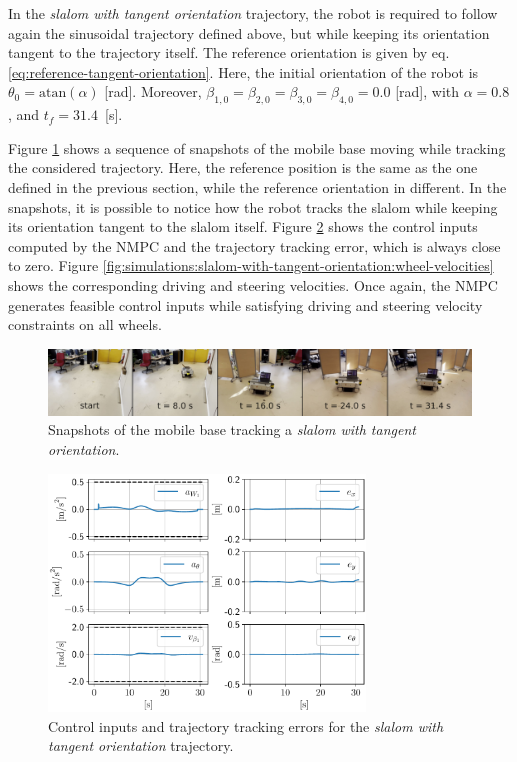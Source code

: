 In the \textit{slalom with tangent orientation} trajectory, the robot is required to follow again the sinusoidal trajectory defined above, but while keeping its orientation tangent to the trajectory itself. The reference orientation is given by eq. \eqref{eq:reference-tangent-orientation}.
Here, the initial orientation of the robot is $\theta_0=\mathrm{atan}(\alpha)$ [rad]. Moreover, $\beta_{1,0}=\beta_{2,0}=\beta_{3,0}=\beta_{4,0}=0.0$ [rad], with $\alpha=0.8$, and $t_f=31.4$~[s].

Figure \ref{fig:experiments:slalom-with-tangent-orientation:snapshots} shows a sequence of snapshots of the mobile base moving while tracking the considered trajectory. Here, the reference position is the same as the one defined in the previous section, while the reference orientation in different. In the snapshots, it is possible to notice how the robot tracks the slalom while keeping its orientation tangent to the slalom itself. Figure \ref{fig:simulations:slalom-with-tangent-orientation:inputs-and-errors} shows the control inputs computed by the NMPC and the trajectory tracking error, which is always close to zero. Figure \ref{fig:simulations:slalom-with-tangent-orientation:wheel-velocities} shows the corresponding driving and steering velocities. Once again, the NMPC generates feasible control inputs while satisfying driving and steering velocity constraints on all wheels.
\begin{figure}
    \centering
    \includegraphics[width=\textwidth]{figures/SWMR/simulations/slalom_with_tangent_orientation/snapshots.jpeg}
    \caption{Snapshots of the mobile base tracking a \textit{slalom with tangent orientation}.}
    \label{fig:experiments:slalom-with-tangent-orientation:snapshots}
\end{figure}
\begin{figure}
    \centering
    \includegraphics[width=0.75\textwidth]{figures/SWMR/simulations/slalom_with_tangent_orientation/inputs_and_errors.pdf}
    \caption{Control inputs and trajectory tracking errors for the \textit{slalom with tangent orientation} trajectory.}
    \label{fig:simulations:slalom-with-tangent-orientation:inputs-and-errors}
\end{figure}
